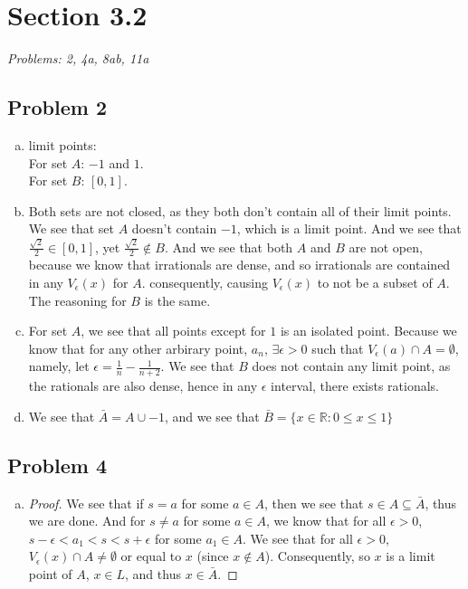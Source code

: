 \documentclass[12pt]{article}
\begin{document}
\vspace*{1cm}


\section*{Section 3.2}
\textit{Problems: 2, 4a, 8ab, 11a}
\subsection*{Problem 2}
\begin{enumerate}[a).]
    \item {
        limit points: \\
        For set $A$: $-1$ and $1$. \\
        For set $B$: $[0,1]$. 
    }
    \item {
        Both sets are not closed, as they both don't contain all of their limit points. 
        We see that set $A$ doesn't contain $-1$, which is a limit point. 
        And we see that $\frac{\sqrt{2}}{2} \in [0,1]$, yet $\frac{\sqrt{2}}{2} \notin B$. 
        And we see that both $A$ and $B$ are not open, because we know that irrationals are dense, and so irrationals are contained in any $V_{\epsilon}(x)$ for $A$. 
        consequently, causing $V_{\epsilon} (x)$ to not be a subset of $A$. 
        The reasoning for $B$ is the same.
    }
    \item {
        For set $A$, we see that all points except for $1$ is an isolated point.
        Because we know that for any other arbirary point, $a_n$, $\exists \epsilon > 0$ such that $V_{\epsilon}(a) \cap A = \emptyset$, namely, let $\epsilon = \frac{1}{n} - \frac{1}{n + 2}$.
        We see that $B$ does not contain any limit point, as the rationals are also dense, hence in any $\epsilon$ interval, there exists rationals. 

    }
    \item {
        We see that $\bar{A} = A \cup {-1}$, and we see that $\bar{B} = \{x \in \mathbb{R} : 0 \le x \le 1\}$

    }
\end{enumerate}



\subsection*{Problem 4}
\begin{enumerate}[a).]
    \item {
        \begin{proof}
            We see that if $s = a$ for some $a \in A$, then we see that $s \in A \subseteq \bar{A}$, thus we are done.
            And for $s \ne a$ for some $a \in A$, we know that for all $\epsilon > 0$, $s - \epsilon < a_1 < s < s + \epsilon$ for some $a_1 \in A$. 
            We see that for all $\epsilon > 0$, $V_{\epsilon}(x) \cap A \ne \emptyset$ or equal to $x$ (since $x \notin A$). 
            Consequently, so $x$ is a limit point of $A$, $x \in L$, and thus $x \in \bar{A}$. 

            
            
        \end{proof}
    }
\end{enumerate}
\end{document}
